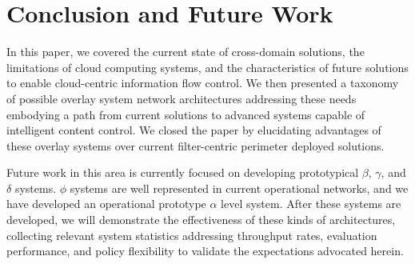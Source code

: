 \documentclass[10pt, conference, compsocconf]{IEEEtran}
\begin{document}
\section{Conclusion and Future Work}
In this paper, we covered the current state of cross-domain solutions, the limitations of cloud computing systems, and the characteristics of future solutions to enable cloud-centric information flow control.  We then presented a taxonomy of possible overlay system network architectures addressing these needs embodying a path from current solutions to advanced systems capable of intelligent content control.  We closed the paper by elucidating advantages of these overlay systems over current filter-centric perimeter deployed solutions.

Future work in this area is currently focused on developing prototypical $\beta$, $\gamma$, and $\delta$ systems.  $\phi$ systems are well represented in current operational networks, and we have developed an operational prototype $\alpha$ level system.  After these systems are developed, we will demonstrate the effectiveness of these kinds of architectures, collecting relevant system statistics addressing throughput rates, evaluation performance, and policy flexibility to validate the expectations advocated herein.



\end{document}
